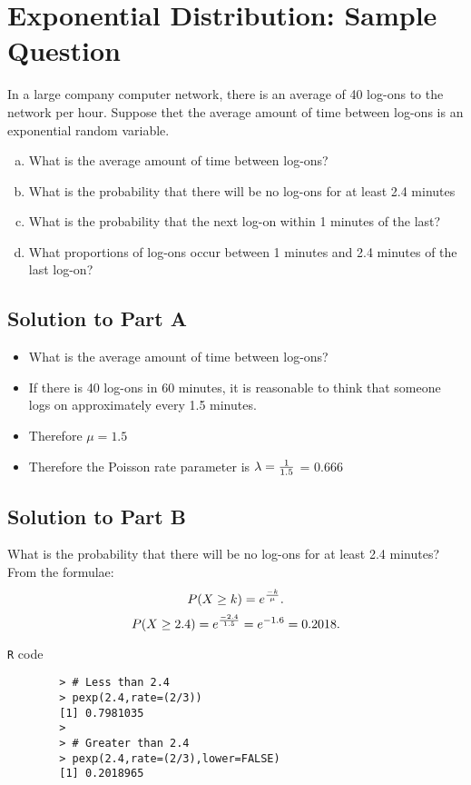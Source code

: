 \documentclass[a4paper,12pt]{article}
\begin{document}
	
	\large 
	
	\section*{Exponential Distribution: Sample Question}
	
	In a large company computer network, there is an average of 40 log-ons to the network per hour. Suppose thet the average amount of time between log-ons is an exponential random variable.
	\medskip
	\begin{enumerate}[(a)]
		\item What is the average amount of time between log-ons?
		\item What is the probability that there will be no log-ons for at least 2.4 minutes
		\item What is the probability that the next log-on within 1 minutes of the last?
		\item What proportions of log-ons occur between 1 minutes and 2.4 minutes of the last log-on?
	\end{enumerate}
	
	\newpage 
	\subsection*{Solution to Part A }
	
	\large
	\begin{itemize} \item What is the average amount of time between log-ons?
		
		\item If there is 40 log-ons in 60 minutes, it is reasonable to think that someone logs on approximately every 1.5 minutes.
		\item Therefore $\mu = 1.5$
		\item Therefore the Poisson rate parameter is $\lambda= {1 \over 1.5}$ = 0.666
	\end{itemize}
	
	\newpage 
	\subsection*{Solution to Part B}
	
	
	What is the probability that there will be no log-ons for at least 2.4 minutes?\\
	
	\medskip 
	From the formulae:
	\[
	P( X \geq k) = e^{{-k \over \mu}} .
	\]
	\[
	P( X \geq 2.4) = e^{{-2.4 \over 1.5}} = e^{-1.6} = 0.2018.
	\]
	\medskip
	\begin{framed}
		\noindent \texttt{R} code 
		\begin{verbatim}
		> # Less than 2.4
		> pexp(2.4,rate=(2/3))
		[1] 0.7981035
		> 
		> # Greater than 2.4
		> pexp(2.4,rate=(2/3),lower=FALSE)
		[1] 0.2018965
		
		\end{verbatim}
	\end{framed}
	
\end{document}
